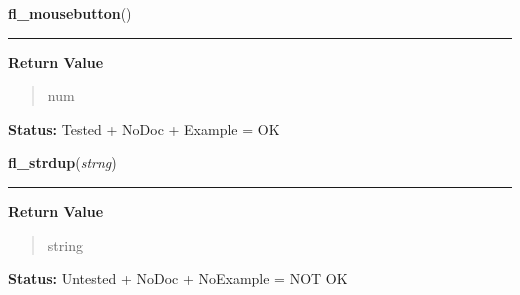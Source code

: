     \label{xformslib:library:fl_mouse_button}

    \vspace{0.5ex}

\hspace{.8\funcindent}\begin{boxedminipage}{\funcwidth}

    \raggedright \textbf{fl\_mousebutton}()

    \vspace{-1.5ex}

    \rule{\textwidth}{0.5\fboxrule}
\setlength{\parskip}{2ex}
\setlength{\parskip}{1ex}
      \textbf{Return Value}
    \vspace{-1ex}

      \begin{quote}
      num

      \end{quote}

\textbf{Status:} Tested + NoDoc + Example = OK



    \end{boxedminipage}

    \label{xformslib:library:fl_strdup}

    \vspace{0.5ex}

\hspace{.8\funcindent}\begin{boxedminipage}{\funcwidth}

    \raggedright \textbf{fl\_strdup}(\textit{strng})

    \vspace{-1.5ex}

    \rule{\textwidth}{0.5\fboxrule}
\setlength{\parskip}{2ex}
\setlength{\parskip}{1ex}
      \textbf{Return Value}
    \vspace{-1ex}

      \begin{quote}
      string

      \end{quote}

\textbf{Status:} Untested + NoDoc + NoExample = NOT OK



    \end{boxedminipage}

